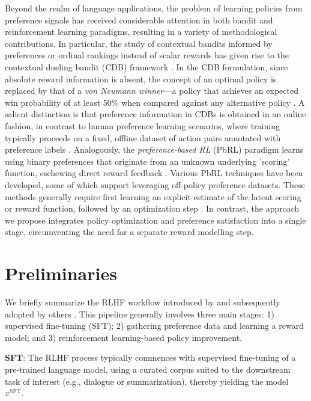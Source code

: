 Beyond the realm of language applications, the problem of learning policies from preference signals has received considerable attention in both bandit and reinforcement learning paradigms, resulting in a variety of methodological contributions. In particular, the study of contextual bandits informed by preferences or ordinal rankings instead of scalar rewards has given rise to the contextual dueling bandit (CDB) framework \citep{yue2012karmed, dudik2015contextual}. In the CDB formulation, since absolute reward information is absent, the concept of an optimal policy is replaced by that of a \textit{von Neumann winner}—a policy that achieves an expected win probability of at least 50\% when compared against any alternative policy \citep{dudik2015contextual}. A salient distinction is that preference information in CDBs is obtained in an online fashion, in contrast to human preference learning scenarios, where training typically proceeds on a fixed, offline dataset of action pairs annotated with preference labels \citep{yan2022human}. Analogously, the \textit{preference-based RL} (PbRL) paradigm learns using binary preferences that originate from an unknown underlying 'scoring' function, eschewing direct reward feedback \citep{BusaFekete2014, ruiz2023dueling}. Various PbRL techniques have been developed, some of which support leveraging off-policy preference datasets. These methods generally require first learning an explicit estimate of the latent scoring or reward function, followed by an optimization step \citep{jain2013learning, BusaFekete2014, christiano2017deep, sadigh2017active, kupcsik2018learning}. In contrast, the approach we propose integrates policy optimization and preference satisfaction into a single stage, circumventing the need for a separate reward modelling step.

\section{Preliminaries}\label{section:prelims}

We briefly summarize the RLHF workflow introduced by \citeauthor{ziegler2020finetuning} and subsequently adopted by others \citep{stiennon2022learning, bai2022training, ouyang2022training}. This pipeline generally involves three main stages: 1) supervised fine-tuning (SFT); 2) gathering preference data and learning a reward model; and 3) reinforcement learning-based policy improvement.

\textbf{SFT}: The RLHF process typically commences with supervised fine-tuning of a pre-trained language model, using a curated corpus suited to the downstream task of interest (e.g., dialogue or summarization), thereby yielding the model $\pi^\text{SFT}$.

